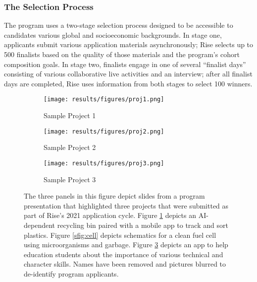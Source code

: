 \subsubsection{The Selection Process}
The program uses a two-stage selection process designed to be accessible to candidates various global and socioeconomic backgrounds. In stage one, applicants submit various application materials asynchronously; Rise selects up to 500 finalists based on the quality of those materials and the program's cohort composition goals. In stage two, finalists engage in one of several ``finalist days'' consisting of various collaborative live activities and an interview; after all finalist days are completed, Rise uses information from both stages to select 100 winners.

\begin{figure}[htbp]
    \centering
    \begin{subfigure}{.45\textwidth}
        \centering
        \texttt{[image: results/figures/proj1.png]}
        \caption{Sample Project 1}
        \label{sfig:can}
    \end{subfigure}
    \hfill
    \vspace{1em}
    \begin{subfigure}{.45\textwidth}
        \centering
        \texttt{[image: results/figures/proj2.png]}
        \caption{Sample Project 2}
        \label{subfisfigg:cell}
    \end{subfigure}
    \hfill
    \vspace{1em}
    \begin{subfigure}{.45\textwidth}
        \centering
        \texttt{[image: results/figures/proj3.png]} 
        \caption{Sample Project 3}
        \label{sfig:app}
    \end{subfigure}
    \caption{The three panels in this figure depict slides from a program presentation that highlighted three projects that were submitted as part of Rise's 2021 application cycle. Figure \ref{sfig:can} depicts an AI-dependent recycling bin paired with a mobile app to track and sort plastics. Figure \ref{sfig:cell} depicts schematics for a clean fuel cell using microorganisms and garbage. Figure \ref{sfig:app} depicts an app to help education students about the importance of various technical and character skills. Names have been removed and pictures blurred to de-identify program applicants.}
    \label{fig:example_projects}
\end{figure}

